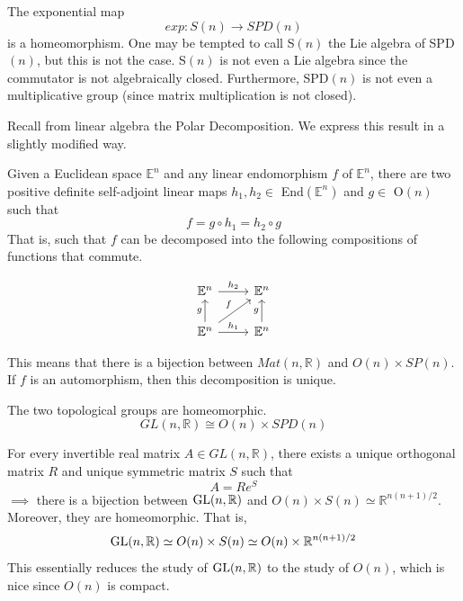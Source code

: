   \begin{lemma}
    The exponential map 
    \begin{equation}
      exp: S(n) \rightarrow SPD(n)
    \end{equation}
    is a homeomorphism. One may be tempted to call S$(n)$ the Lie algebra of SPD$(n)$, but this is not the case. S$(n)$ is not even a Lie algebra since the commutator is not algebraically closed. Furthermore, SPD$(n)$ is not even a multiplicative group (since matrix multiplication is not closed). 
  \end{lemma}

  Recall from linear algebra the Polar Decomposition. We express this result in a slightly modified way. 

  \begin{theorem}
    Given a Euclidean space $\mathbb{E}^n$ and any linear endomorphism $f$ of $\mathbb{E}^n$, there are two positive definite self-adjoint linear maps $h_1, h_2 \in$ End$(\mathbb{E}^n)$ and $g \in$ O$(n)$ such that
    \begin{equation}
      f = g \circ h_1 = h_2 \circ g
    \end{equation}
    That is, such that $f$ can be decomposed into the following compositions of functions that commute. 

    \[\begin{tikzcd}
    \mathbb{E}^n \arrow{r}{h_2} & \mathbb{E}^n \\
    \mathbb{E}^n \arrow{u}{g} \arrow{ur}{f} \arrow{r}{h_1} & \mathbb{E}^n \arrow{u}{g}
    \end{tikzcd}\]

    This means that there is a bijection between $Mat(n, \mathbb{R})$ and $O(n) \times SP(n)$. If $f$ is an automorphism, then this decomposition is unique. 
  \end{theorem}

  \begin{corollary}
    The two topological groups are homeomorphic. 
    \begin{equation}
      GL(n, \mathbb{R}) \cong O(n) \times SPD(n)
    \end{equation}
  \end{corollary}

  \begin{corollary}
    For every invertible real matrix $A \in GL(n, \mathbb{R})$, there exists a unique orthogonal matrix $R$ and unique symmetric matrix $S$ such that
    \begin{equation}
      A = R e^S
    \end{equation}
    $\implies$ there is a bijection between $\operatorname{GL}(n, \mathbb{R})$ and $O(n) \times S(n) \simeq \mathbb{R}^{n(n+1)/2}$. Moreover, they are homeomorphic. That is, 
    \begin{equation}
      \operatorname{GL}(n, \mathbb{R}) \simeq O(n) \times S(n) \simeq O(n) \times \mathbb{R}^{n(n+1)/2}
    \end{equation}
    This essentially reduces the study of $\operatorname{GL}(n, \mathbb{R})$ to the study of $O(n)$, which is nice since $O(n)$ is compact. 
  \end{corollary}

